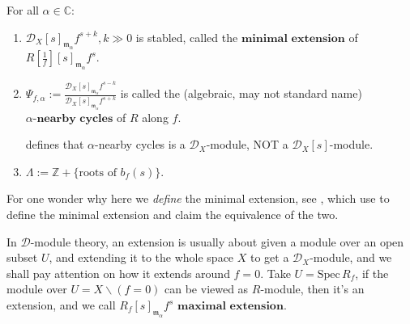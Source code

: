 \begin{definition}\label{def:algebraic_nearby_cycle}
    For all $\alpha \in \mathbb{C}$:
    \begin{enumerate}
        \item $\mathcal{D}_X[s]_{\mathfrak{m}_\alpha} f^{s+k},  k \gg 0$ is stabled, called the $\textbf{minimal extension}$ of $R[\frac{1}{f}][s]_{\mathfrak{m}_\alpha} f^s$.
        \item $\Psi_{f,\alpha} := \frac{\mathcal{D}_X[s]_{\mathfrak{m}_\alpha} f^{s-k}}{\mathcal{D}_X[s]_{\mathfrak{m}_\alpha} f^{s+k}}$ is called the (algebraic, may not standard name) $\alpha\textbf{-nearby cycles}$ of $R$ along $f$.

              \cite[Definition~3.3.2.]{PopaDMBG2021} defines that $\alpha$-nearby cycles is a $\mathcal{D}_X$-module, NOT a $\mathcal{D}_X[s]$-module.
        \item $\Lambda := \mathbb{Z} + \{\text{roots of } b_{f}(s)\}$.
    \end{enumerate}
\end{definition}

\begin{remark}
    For one wonder why here we \emph{define} the minimal extension,
    see \cite[Theorem~2.10]{Wu2020ComparisonNearbyCyclesBfunctions}, which use
    \cite[Def~3.4.1]{hotta2008d} to define the minimal extension and claim the equivalence of the two.

    In $\mathcal{D}$-module theory,
    an extension is usually about given a module over an open subset $U$,
    and extending it to the whole space $X$ to get a $\mathcal{D}_{X}$-module,
    and we shall pay attention on how it extends around $f=0$.
    Take $U=\mathrm{Spec}\, R_{f}$,
    if the module over $U=X\backslash(f=0)$ can be viewed as $R$-module,
    then it's an extension,
    and we call $R_{f}[s]_{\mathfrak{m}_{\alpha}}f^{s}$  $\textbf{maximal extension}$.
\end{remark}

